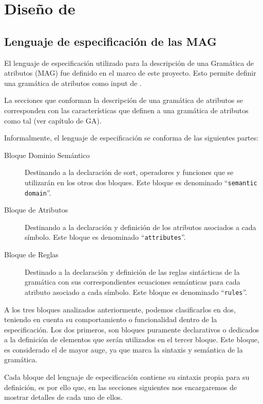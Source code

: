 \chapter{Diseño de \maggen}
\label{chap:disen_}
\minitoc

\section{Lenguaje de especificación de las MAG}
\label{sec:lenguajeMAG}

El lenguaje de especificación utilizado para la descripción de una Gramática de atributos (MAG) fue definido en el marco de este proyecto. Esto permite definir una gramática de atributos como input de \maggen.
 
La secciones que conforman la descripción de una gramática de atributos se corresponden con las características que definen a una gramática de atributos como tal (ver capítulo de GA).
 
Informalmente, el lenguaje de especificación se conforma de las siguientes partes:

\begin{description}
\item [Bloque Dominio Semántico] Destinando a la declaración de sort, operadores y funciones que se utilizarán en los otros dos bloques. Este bloque es denominado ``\texttt{semantic domain}''.

\item [Bloque de Atributos] Destinando a la declaración y definición de los atributos asociados a cada símbolo. Este bloque es denominado ``\texttt{attributes}''.

\item [Bloque de Reglas] Destinado a la declaración y definición de las reglas sintácticas de la gramática con sus correspondientes ecuaciones semánticas para cada atributo asociado a cada símbolo. Este bloque es denominado ``\texttt{rules}''.
\end{description}

A los tres bloques analizados anteriormente, podemos clasificarlos en dos, teniendo en cuenta su comportamiento o funcionalidad dentro de la especificación. Los dos primeros, son bloques puramente declarativos o dedicados a la definición de elementos que serán utilizados en el tercer bloque. Este bloque, es considerado el de mayor auge, ya que marca la sintaxis y semántica de la gramática.

Cada bloque del lenguaje de especificación contiene su sintaxis propia para su definición, es por ello que, en las secciones siguientes nos encargaremos de mostrar detalles de cada uno de ellos.

